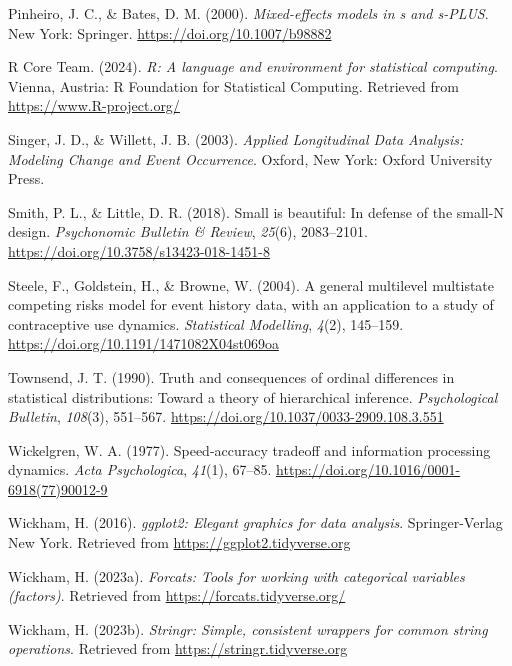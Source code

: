 \documentclass[
  man,floatsintext]{apa6}
\newlength{\cslhangindent}
\newenvironment{CSLReferences}[2] %
 {\begin{list}{}{%
  \setlength{\itemindent}{0pt}
  \setlength{\leftmargin}{0pt}
  \setlength{\parsep}{0pt}
  \ifodd #1
   \setlength{\leftmargin}{\cslhangindent}
   \setlength{\itemindent}{-1\cslhangindent}
  \fi
  \setlength{\itemsep}{#2\baselineskip}}}
 {\end{list}}
\begin{document}
\begin{CSLReferences}{1}{0}
Pinheiro, J. C., \& Bates, D. M. (2000). \emph{Mixed-effects models in s and s-PLUS}. New York: Springer. \url{https://doi.org/10.1007/b98882}

R Core Team. (2024). \emph{R: A language and environment for statistical computing}. Vienna, Austria: R Foundation for Statistical Computing. Retrieved from \url{https://www.R-project.org/}

Singer, J. D., \& Willett, J. B. (2003). \emph{Applied {Longitudinal Data Analysis}: {Modeling Change} and {Event Occurrence}}. Oxford, New York: Oxford University Press.

Smith, P. L., \& Little, D. R. (2018). Small is beautiful: {In} defense of the small-{N} design. \emph{Psychonomic Bulletin \& Review}, \emph{25}(6), 2083--2101. \url{https://doi.org/10.3758/s13423-018-1451-8}

Steele, F., Goldstein, H., \& Browne, W. (2004). A general multilevel multistate competing risks model for event history data, with an application to a study of contraceptive use dynamics. \emph{Statistical Modelling}, \emph{4}(2), 145--159. \url{https://doi.org/10.1191/1471082X04st069oa}

Townsend, J. T. (1990). Truth and consequences of ordinal differences in statistical distributions: {Toward} a theory of hierarchical inference. \emph{Psychological Bulletin}, \emph{108}(3), 551--567. \url{https://doi.org/10.1037/0033-2909.108.3.551}

Wickelgren, W. A. (1977). Speed-accuracy tradeoff and information processing dynamics. \emph{Acta Psychologica}, \emph{41}(1), 67--85. \url{https://doi.org/10.1016/0001-6918(77)90012-9}

Wickham, H. (2016). \emph{ggplot2: Elegant graphics for data analysis}. Springer-Verlag New York. Retrieved from \url{https://ggplot2.tidyverse.org}

Wickham, H. (2023a). \emph{Forcats: Tools for working with categorical variables (factors)}. Retrieved from \url{https://forcats.tidyverse.org/}

Wickham, H. (2023b). \emph{Stringr: Simple, consistent wrappers for common string operations}. Retrieved from \url{https://stringr.tidyverse.org}


\end{CSLReferences}
\end{document}
